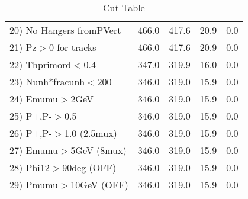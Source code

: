 \begin{table}[h!]
\begin{tabular}{||l||r|r|r|r||}
 20) No Hangers fromPVert &       466.0 &       417.6 &        20.9 &         0.0 \\
 21) Pz$>$0 for tracks    &       466.0 &       417.6 &        20.9 &         0.0 \\
 22) Thprimord$<$0.4      &       347.0 &       319.9 &        16.0 &         0.0 \\
 23) Nunh*fracunh$<$200   &       346.0 &       319.0 &        15.9 &         0.0 \\
 24) Emumu$>$2GeV         &       346.0 &       319.0 &        15.9 &         0.0 \\
 25) P+,P-$>$0.5          &       346.0 &       319.0 &        15.9 &         0.0 \\
 26) P+,P-$>$1.0 (2.5mux) &       346.0 &       319.0 &        15.9 &         0.0 \\
 27) Emumu$>$5GeV  (8mux) &       346.0 &       319.0 &        15.9 &         0.0 \\
 28) Phi12$>$90deg  (OFF) &       346.0 &       319.0 &        15.9 &         0.0 \\
 29) Pmumu$>$10GeV  (OFF) &       346.0 &       319.0 &        15.9 &         0.0 \\
 \hline
 \hline
 \end{tabular}
 \caption{Cut Table \cohrp  }
 \label{tab-cut_crhop}
 \end{table}
